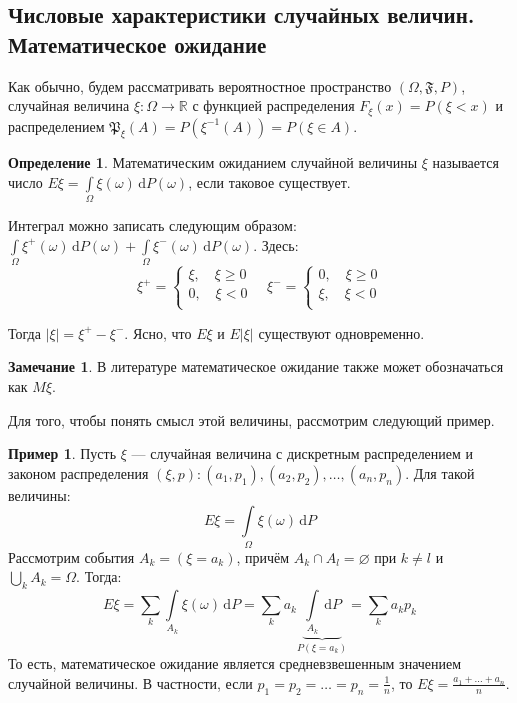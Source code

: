 \documentclass[11pt,openany,a4paper]{scrartcl}
\theoremstyle{plain}
\theoremstyle{definition}
\newtheorem{definition}[theorem]{Определение}
\newtheorem{remark}[theorem]{Замечание}
\newtheorem{example}[theorem]{Пример}
\newcommand\mb{\mathbb}
\newcommand\real{\mb R}
\newcommand{\dif}{\, \mathrm d}
\begin{document}
\subsection{Числовые характеристики случайных величин. Математическое ожидание}

Как обычно, будем рассматривать вероятностное пространство
$(\Omega, \mathfrak{F}, P)$, случайная величина $\xi: \Omega \to \real$ с функцией
распределения $F_\xi(x) = P(\xi < x)$ и распределением $\mathfrak P_\xi(A) =
P(\xi^{-1}(A)) = P(\xi \in A)$.

\begin{definition}
    Математическим ожиданием случайной величины $\xi$ называется число
    $E\xi = \int\limits_\Omega \xi(\omega) \dif P(\omega)$, если таковое
    существует.
\end{definition}

Интеграл можно записать следующим образом:
$\int\limits_\Omega \xi^+ (\omega) \dif P(\omega) + \int\limits_\Omega
\xi^-(\omega)\dif P(\omega)$. Здесь:
$$
\xi^+ =
\begin{cases}
    \xi,\quad \xi \geqslant 0 \\
    0,\quad \xi < 0 \\
\end{cases}
\quad
\xi^- =
\begin{cases}
    0,\quad \xi \geqslant 0 \\
    \xi,\quad \xi < 0 \\
\end{cases}
$$

Тогда $|\xi| = \xi^+ - \xi^-$. Ясно, что $E\xi$ и $E|\xi|$ существуют 
одновременно.

\begin{remark}
    В литературе математическое ожидание также может обозначаться как $M\xi$.
\end{remark}

Для того, чтобы понять смысл этой величины, рассмотрим следующий пример.

\begin{example}
    Пусть $\xi$ — случайная величина с дискретным распределением и законом 
    распределения $(\xi, p): (a_1, p_1), (a_2, p_2), \ldots, (a_n, p_n)$.
    Для такой величины:
    $$
    E\xi = \int\limits_\Omega \xi(\omega) \dif P
    $$
    Рассмотрим события $A_k = (\xi = a_k)$, причём $A_k \cap A_l = \varnothing$ 
    при $k \neq l$ и $\bigcup\limits_k A_k = \Omega$. Тогда:
    $$
    E\xi = \sum\limits_k \int\limits_{A_k} \xi(\omega) \dif P =
    \sum\limits_k a_k \underbrace{\int\limits_{A_k} \dif P}_{P(\xi = a_k)} = \sum\limits_k a_kp_k
    $$
    То есть, математическое ожидание является средневзвешенным значением случайной
    величины.
    В частности, если $p_1 = p_2 = \ldots = p_n = \frac{1}{n}$, то
    $E\xi = \frac{a_1 + \ldots + a_n}{n}$.
\end{example}
\end{document}
